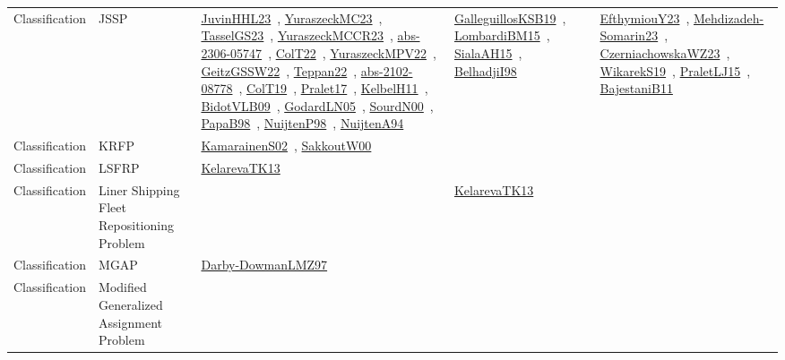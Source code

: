 {\begin{longtable}{lp{3cm}>{\raggedright\arraybackslash}p{6cm}>{\raggedright\arraybackslash}p{6cm}>{\raggedright\arraybackslash}p{8cm}}
Classification & JSSP & \href{works/JuvinHHL23.pdf}{JuvinHHL23}~\cite{JuvinHHL23}, \href{works/YuraszeckMC23.pdf}{YuraszeckMC23}~\cite{YuraszeckMC23}, \href{works/TasselGS23.pdf}{TasselGS23}~\cite{TasselGS23}, \href{works/YuraszeckMCCR23.pdf}{YuraszeckMCCR23}~\cite{YuraszeckMCCR23}, \href{works/abs-2306-05747.pdf}{abs-2306-05747}~\cite{abs-2306-05747}, \href{works/ColT22.pdf}{ColT22}~\cite{ColT22}, \href{works/YuraszeckMPV22.pdf}{YuraszeckMPV22}~\cite{YuraszeckMPV22}, \href{works/GeitzGSSW22.pdf}{GeitzGSSW22}~\cite{GeitzGSSW22}, \href{works/Teppan22.pdf}{Teppan22}~\cite{Teppan22}, \href{works/abs-2102-08778.pdf}{abs-2102-08778}~\cite{abs-2102-08778}, \href{works/ColT19.pdf}{ColT19}~\cite{ColT19}, \href{works/Pralet17.pdf}{Pralet17}~\cite{Pralet17}, \href{works/KelbelH11.pdf}{KelbelH11}~\cite{KelbelH11}, \href{works/BidotVLB09.pdf}{BidotVLB09}~\cite{BidotVLB09}, \href{works/GodardLN05.pdf}{GodardLN05}~\cite{GodardLN05}, \href{works/SourdN00.pdf}{SourdN00}~\cite{SourdN00}, \href{works/PapaB98.pdf}{PapaB98}~\cite{PapaB98}, \href{works/NuijtenP98.pdf}{NuijtenP98}~\cite{NuijtenP98}, \href{works/NuijtenA94.pdf}{NuijtenA94}~\cite{NuijtenA94} & \href{works/GalleguillosKSB19.pdf}{GalleguillosKSB19}~\cite{GalleguillosKSB19}, \href{works/LombardiBM15.pdf}{LombardiBM15}~\cite{LombardiBM15}, \href{works/SialaAH15.pdf}{SialaAH15}~\cite{SialaAH15}, \href{works/BelhadjiI98.pdf}{BelhadjiI98}~\cite{BelhadjiI98} & \href{works/EfthymiouY23.pdf}{EfthymiouY23}~\cite{EfthymiouY23}, \href{works/Mehdizadeh-Somarin23.pdf}{Mehdizadeh-Somarin23}~\cite{Mehdizadeh-Somarin23}, \href{works/CzerniachowskaWZ23.pdf}{CzerniachowskaWZ23}~\cite{CzerniachowskaWZ23}, \href{works/WikarekS19.pdf}{WikarekS19}~\cite{WikarekS19}, \href{works/PraletLJ15.pdf}{PraletLJ15}~\cite{PraletLJ15}, \href{works/BajestaniB11.pdf}{BajestaniB11}~\cite{BajestaniB11}\\
Classification & KRFP & \href{works/KamarainenS02.pdf}{KamarainenS02}~\cite{KamarainenS02}, \href{works/SakkoutW00.pdf}{SakkoutW00}~\cite{SakkoutW00} &  & \\
Classification & LSFRP & \href{works/KelarevaTK13.pdf}{KelarevaTK13}~\cite{KelarevaTK13} &  & \\
Classification & Liner Shipping Fleet Repositioning Problem &  & \href{works/KelarevaTK13.pdf}{KelarevaTK13}~\cite{KelarevaTK13} & \\
Classification & MGAP & \href{works/Darby-DowmanLMZ97.pdf}{Darby-DowmanLMZ97}~\cite{Darby-DowmanLMZ97} &  & \\
Classification & Modified Generalized Assignment Problem &  &  & \\

\end{longtable}}
